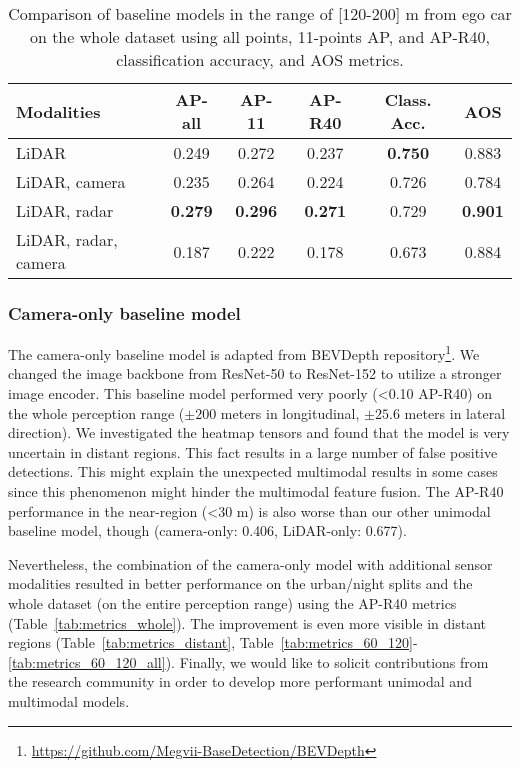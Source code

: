 \documentclass{article}
\begin{document}
\begin{table*}[!h]
  \small
  \centering
  \begin{tabular}{@{}l|ccccc@{}}
    \toprule
    Modalities          & AP-all    & AP-11     & AP-R40    & Class. Acc.   & AOS\\
    \midrule
    LiDAR               & 0.249     & 0.272     & 0.237     & \bf{0.750}    & 0.883 \\
    LiDAR, camera       & 0.235     & 0.264     & 0.224     & 0.726         & 0.784 \\
    LiDAR, radar        & \bf{0.279}& \bf{0.296}& \bf{0.271}& 0.729         & \bf{0.901} \\
    LiDAR, radar, camera & 0.187    & 0.222     & 0.178     & 0.673         & 0.884 \\
    \bottomrule
  \end{tabular}
  \caption{Comparison of baseline models in the range of [120-200] m from ego car on the whole dataset using all points, 11-points AP, and AP-R40, classification accuracy, and AOS metrics.}
  \label{tab:metrics14}
\end{table*}

\subsubsection{Camera-only baseline model}
The camera-only baseline model is adapted from BEVDepth repository\footnote{\href{https://github.com/Megvii-BaseDetection/BEVDepth}{https://github.com/Megvii-BaseDetection/BEVDepth}}. We changed the image backbone from ResNet-50 to ResNet-152 to utilize a stronger image encoder. This baseline model performed very poorly (<0.10 AP-R40) on the whole perception range ($\pm200$ meters in longitudinal, $\pm25.6$ meters in lateral direction). We investigated the heatmap tensors and found that the model is very uncertain in distant regions. This fact results in a large number of false positive detections. This might explain the unexpected multimodal results in some cases since this phenomenon might hinder the multimodal feature fusion. The AP-R40 performance in the near-region (<30 m) is also worse than our other unimodal baseline model, though (camera-only: 0.406,  LiDAR-only: 0.677).

Nevertheless, the combination of the camera-only model with additional sensor modalities resulted in better performance on the urban/night splits and the whole dataset (on the entire perception range) using the AP-R40 metrics (Table~\ref{tab:metrics_whole}). The improvement is even more visible in distant regions (Table~\ref{tab:metrics_distant}, Table~\ref{tab:metrics_60_120}-\ref{tab:metrics_60_120_all}). Finally, we would like to solicit contributions from the research community in order to develop more performant unimodal and multimodal models.
\end{document}
